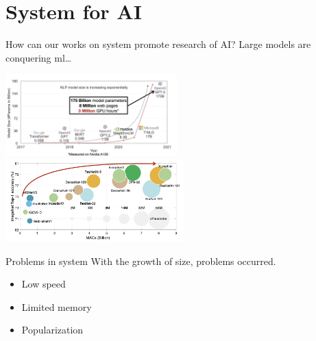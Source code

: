 \documentclass[UTF8]{beamer}
\begin{document}
\section{System for AI}

\begin{frame}{How can our works on system promote research of AI?}
  Large models are conquering ml\dots
  \begin{center}
    \includegraphics[height=90pt]{figure/nlp_large_models.png}
    \includegraphics[height=90pt]{figure/cv_large_models.png}
  \end{center}
\end{frame}

\begin{frame}{Problems in system}
  With the growth of size, problems occurred.
  \begin{itemize}
    \item <2-> Low speed
    \item <3-> Limited memory
    \item <4-> Popularization
  \end{itemize}
\end{frame}
\end{document}
